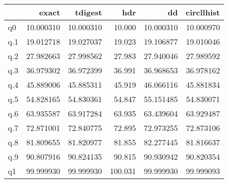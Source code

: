 \begin{tabular}{lrrrrr}
\toprule
{} &      exact &    tdigest &      hdr &         dd &  circllhist \\
\midrule
q0  &  10.000310 &  10.000310 &   10.000 &  10.000310 &   10.000970 \\
q.1 &  19.012718 &  19.027037 &   19.023 &  19.106877 &   19.010046 \\
q.2 &  27.982663 &  27.998562 &   27.983 &  27.940046 &   27.989592 \\
q.3 &  36.979302 &  36.972399 &   36.991 &  36.968653 &   36.978162 \\
q.4 &  45.889006 &  45.885311 &   45.919 &  46.066116 &   45.881834 \\
q.5 &  54.828165 &  54.830361 &   54.847 &  55.151485 &   54.830071 \\
q.6 &  63.935587 &  63.917284 &   63.935 &  63.439604 &   63.929487 \\
q.7 &  72.871001 &  72.840775 &   72.895 &  72.973255 &   72.873106 \\
q.8 &  81.809655 &  81.820977 &   81.855 &  82.277445 &   81.816637 \\
q.9 &  90.807916 &  90.824135 &   90.815 &  90.930942 &   90.820354 \\
q1  &  99.999930 &  99.999930 &  100.031 &  99.999930 &   99.999093 \\
\bottomrule
\end{tabular}
